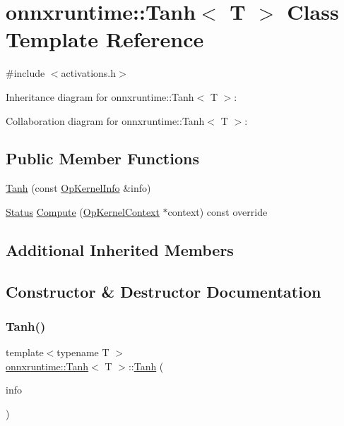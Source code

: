 \hypertarget{classonnxruntime_1_1Tanh}{}\section{onnxruntime\+:\+:Tanh$<$ T $>$ Class Template Reference}
\label{classonnxruntime_1_1Tanh}


{\ttfamily \#include $<$activations.\+h$>$}



Inheritance diagram for onnxruntime\+:\+:Tanh$<$ T $>$\+:


Collaboration diagram for onnxruntime\+:\+:Tanh$<$ T $>$\+:
\subsection*{Public Member Functions}
\begin{DoxyCompactItemize}
\item 
\mbox{\hyperlink{classonnxruntime_1_1Tanh_aa3d53a9dc9a3f36f860efb15aa4474aa}{Tanh}} (const \mbox{\hyperlink{classonnxruntime_1_1OpKernelInfo}{Op\+Kernel\+Info}} \&info)
\item 
\mbox{\hyperlink{classonnxruntime_1_1common_1_1Status}{Status}} \mbox{\hyperlink{classonnxruntime_1_1Tanh_af6256a08ee59334b61d4a6790d34e698}{Compute}} (\mbox{\hyperlink{classonnxruntime_1_1OpKernelContext}{Op\+Kernel\+Context}} $\ast$context) const override
\end{DoxyCompactItemize}
\subsection*{Additional Inherited Members}


\subsection{Constructor \& Destructor Documentation}
\mbox{\label{classonnxruntime_1_1Tanh_aa3d53a9dc9a3f36f860efb15aa4474aa}} 
\subsubsection{\texorpdfstring{Tanh()}{Tanh()}}
{\footnotesize\ttfamily template$<$typename T $>$ \\
\mbox{\hyperlink{classonnxruntime_1_1Tanh}{onnxruntime\+::\+Tanh}}$<$ T $>$\+::\mbox{\hyperlink{classonnxruntime_1_1Tanh}{Tanh}} (\begin{DoxyParamCaption}\item[{const \mbox{\hyperlink{classonnxruntime_1_1OpKernelInfo}{Op\+Kernel\+Info}} \&}]{info }\end{DoxyParamCaption})\hspace{0.3cm}{\ttfamily [inline]}}



